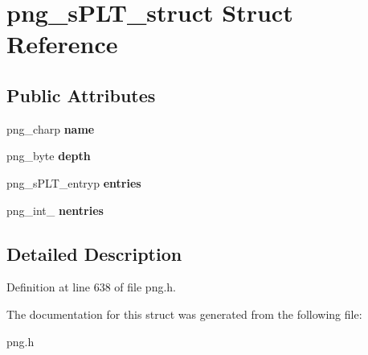\hypertarget{structpng__sPLT__struct}{\section{png\+\_\+s\+P\+L\+T\+\_\+struct Struct Reference}
\label{structpng__sPLT__struct}
}
\subsection*{Public Attributes}
\begin{DoxyCompactItemize}
\item 
\hypertarget{structpng__sPLT__struct_af3b088b149e790b9b98ebedde69a70f0}{png\+\_\+charp {\bfseries name}}\label{structpng__sPLT__struct_af3b088b149e790b9b98ebedde69a70f0}

\item 
\hypertarget{structpng__sPLT__struct_a6e667882cd16c9675455cebd49898b22}{png\+\_\+byte {\bfseries depth}}\label{structpng__sPLT__struct_a6e667882cd16c9675455cebd49898b22}

\item 
\hypertarget{structpng__sPLT__struct_a4c7db13fb1a7f0ede434e174b20151ec}{png\+\_\+s\+P\+L\+T\+\_\+entryp {\bfseries entries}}\label{structpng__sPLT__struct_a4c7db13fb1a7f0ede434e174b20151ec}

\item 
\hypertarget{structpng__sPLT__struct_ac5844e98e4c43733bad6b83b54dc7a9f}{png\+\_\+int\+\_ {\bfseries nentries}}\label{structpng__sPLT__struct_ac5844e98e4c43733bad6b83b54dc7a9f}

\end{DoxyCompactItemize}


\subsection{Detailed Description}


Definition at line 638 of file png.\+h.



The documentation for this struct was generated from the following file\+:\begin{DoxyCompactItemize}
\item 
png.\+h\end{DoxyCompactItemize}
